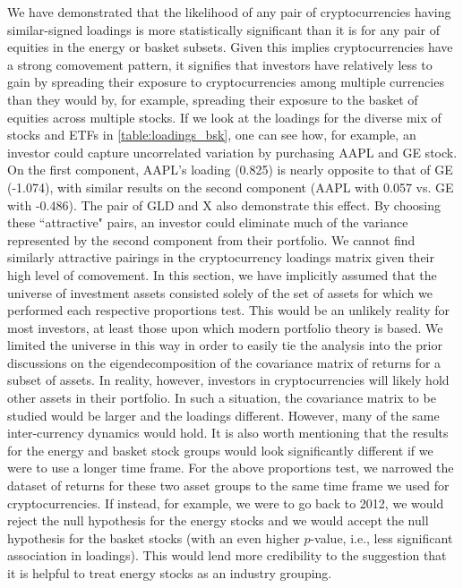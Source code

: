 \documentclass[12pt,twoside]{article}
\begin{document}
We have demonstrated that the likelihood of any pair of cryptocurrencies having similar-signed loadings is more statistically significant than it is for any pair of equities in the energy or basket subsets. Given this implies cryptocurrencies have a strong comovement pattern, it signifies that investors have relatively less to gain by spreading their exposure to cryptocurrencies among multiple currencies than they would by, for example, spreading their exposure to the basket of equities across multiple stocks. If we look at the loadings for the diverse mix of stocks and ETFs in \ref{table:loadings_bsk}, one can see how, for example, an investor could capture uncorrelated variation by purchasing AAPL and GE stock. On the first component, AAPL's loading (0.825) is nearly opposite to that of GE (-1.074), with similar results on the second component (AAPL with 0.057 vs. GE with -0.486). The pair of GLD and X also demonstrate this effect. By choosing these ``attractive" pairs, an investor could eliminate much of the variance represented by the second component from their portfolio. We cannot find similarly attractive pairings in the cryptocurrency loadings matrix given their high level of comovement.
\bigbreak
In this section, we have implicitly assumed that the universe of investment assets consisted solely of the set of assets for which we performed each respective proportions test. This would be an unlikely reality for most investors, at least those upon which modern portfolio theory is based. We limited the universe in this way in order to easily tie the analysis into the prior discussions on the eigendecomposition of the covariance matrix of returns for a subset of assets. In reality, however, investors in cryptocurrencies will likely hold other assets in their portfolio. In such a situation, the covariance matrix to be studied would be larger and the loadings different. However, many of the same inter-currency dynamics would hold. It is also worth mentioning that the results for the energy and basket stock groups would look significantly different if we were to use a longer time frame. For the above proportions test, we narrowed the dataset of returns for these two asset groups to the same time frame we used for cryptocurrencies. If instead, for example, we were to go back to 2012, we would reject the null hypothesis for the energy stocks and we would accept the null hypothesis for the basket stocks (with an even higher $p$-value, i.e., less significant association in loadings). This would lend more credibility to the suggestion that it is helpful to treat energy stocks as an industry grouping.
\end{document}
